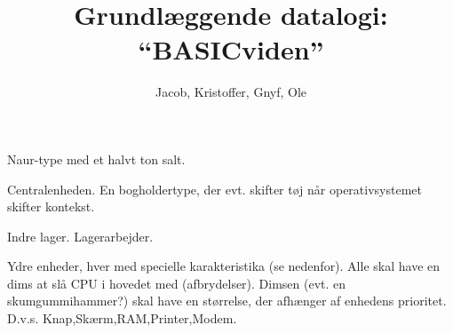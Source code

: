 \documentclass[a4paper,11pt]{article}
\begin{document}
\title{Grundlæggende datalogi: ``BASICviden''}

\author{Jacob, Kristoffer, Gnyf, Ole}



\maketitle

\begin{roles}





Naur-type med et halvt ton salt.


 Centralenheden. En bogholdertype, der evt. skifter tøj
når operativsystemet skifter kontekst.

   Indre lager. Lagerarbejder.

 Ydre enheder, hver med
specielle karakteristika (se nedenfor). Alle skal have en dims at slå
CPU i hovedet med (afbrydelser). Dimsen (evt. en skumgummihammer?)
skal have en størrelse, der afhænger af enhedens prioritet. D.v.s.
Knap,Skærm,RAM,Printer,Modem.

\end{roles}
\end{document}

